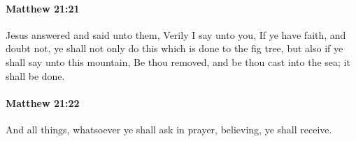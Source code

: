		\paragraph{Matthew 21:21} %
			\label{MATTHEW-21-21}

			Jesus answered and said unto them, Verily I say unto you, If ye have faith, and doubt not, ye shall not only do this which is done to the fig tree, but also if ye shall say unto this mountain, Be thou removed, and be thou cast into the sea; it shall be done.

			\begin{framed}
			\scriptsize
				\begin{compactdesc}
					\item[SBLG] 
				\end{compactdesc}
			\end{framed}

		\paragraph{Matthew 21:22} %
			\label{MATTHEW-21-22}

			And all things, whatsoever ye shall ask in prayer, believing, ye shall receive.

